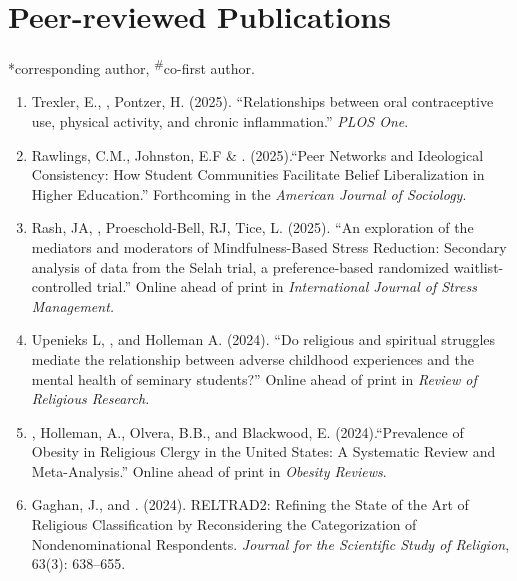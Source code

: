 \newcommand{\Revision}{\textit{under revision}}
\newcommand{\CS}{*} %
\newcommand{\CF}{\textsuperscript{\#}} %

\section*{Peer-reviewed Publications}
\CS corresponding author, \CF co-first author.

\begin{enumerate}
\item Trexler, E., \Eagle, Pontzer, H. (2025). ``Relationships between oral contraceptive use, physical activity, and chronic inflammation.''  \textit{PLOS One}. 

\item Rawlings, C.M., Johnston, E.F \& \Eagle. (2025).``Peer Networks and Ideological Consistency: How Student Communities Facilitate Belief Liberalization in Higher Education.'' Forthcoming in the \textit{American Journal of Sociology}. 

\item Rash, JA, \Eagle, Proeschold-Bell, RJ, Tice, L. (2025). ``An exploration of the mediators and moderators of Mindfulness-Based Stress Reduction: Secondary analysis of data from the Selah trial, a preference-based randomized waitlist-controlled trial.'' Online ahead of print in \textit{International Journal of Stress Management.} 

\item Upenieks L, \Eagle, and Holleman A.  (2024). ``Do religious and spiritual struggles mediate the relationship between adverse childhood experiences and the mental health of seminary students?'' Online ahead of print in  \textit{Review of Religious Research.} 

\item \Eagle, Holleman, A., Olvera, B.B., and Blackwood, E. (2024).``Prevalence of Obesity in Religious Clergy in the United States: A Systematic Review and Meta-Analysis.'' Online ahead of print in \textit{Obesity Reviews}. 

\item Gaghan, J., and \Eagle. (2024). RELTRAD2: Refining the State of the Art of Religious Classification by Reconsidering the Categorization of Nondenominational Respondents. \textit{Journal for the Scientific Study of Religion}, 63(3): 638--655. 


\end{enumerate}
